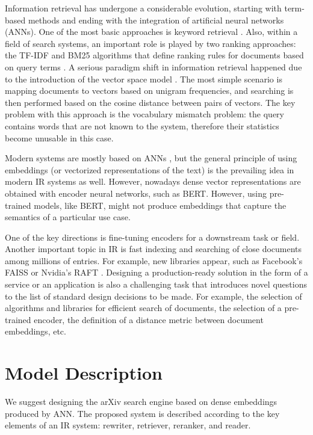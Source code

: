 \documentclass{article}
\begin{document}
    Information retrieval has undergone a considerable evolution, starting with term-based methods and ending with the integration of artificial neural networks (ANNs). One of the most basic approaches is keyword retrieval \cite{salton1988term}. Also, within a field of search systems, an important role is played by two ranking approaches: the TF-IDF and BM25 algorithms that define ranking rules for documents based on query terms \cite{robertson1995okapi}. A serious paradigm shift in information retrieval happened due to the introduction of the vector space model \cite{salton1975vector}. The most simple scenario is mapping documents to vectors based on unigram frequencies, and searching is then performed based on the cosine distance between pairs of vectors. The key problem with this approach is the vocabulary mismatch problem: the query contains words that are not known to the system, therefore their statistics become unusable in this case. 
    
    Modern systems are mostly based on ANNs \cite{lin2022pretrained}, but the general principle of using embeddings (or vectorized representations of the text) is the prevailing idea in modern IR systems as well. However, nowadays dense vector representations are obtained with encoder neural networks, such as BERT. However, using pre-trained models, like BERT, might not produce embeddings that capture the semantics of a particular use case. 
    
    One of the key directions is fine-tuning encoders for a downstream task or field. Another important topic in IR is fast indexing and searching of close documents among millions of entries. For example, new libraries appear, such as Facebook's FAISS \cite{faiss} or Nvidia's RAFT \cite{raft}. Designing a production-ready solution in the form of a service or an application is also a challenging task that introduces novel questions to the list of standard design decisions to be made. For example, the selection of algorithms and libraries for efficient search of documents, the selection of a pre-trained encoder, the definition of a distance metric between document embeddings, etc. 

\section{Model Description}\label{sec:methodology}
    We suggest designing the arXiv search engine based on dense embeddings produced by ANN. The proposed system is described according to the key elements of an IR system: rewriter, retriever, reranker, and reader.
    
\end{document}
